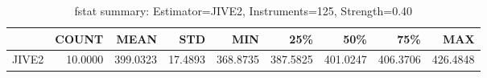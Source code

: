 \begin{table}[ht]
\centering
\caption{fstat summary: Estimator=JIVE2, Instruments=125, Strength=0.40}
\begin{tabular}{lrrrrrrrr}
\toprule
 & COUNT & MEAN & STD & MIN & 25\% & 50\% & 75\% & MAX \\
\midrule
JIVE2 & 10.0000 & 399.0323 & 17.4893 & 368.8735 & 387.5825 & 401.0247 & 406.3706 & 426.4848 \\
\bottomrule
\end{tabular}
\end{table}
